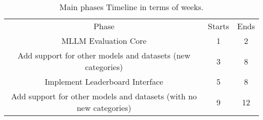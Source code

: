 \begin{table}
 \begin{tabular}{|c|c|c|}
     Phase & Starts & Ends \\
     MLLM Evaluation Core & 1 & 2 \\
     Add support for other models and datasets (new categories) & 3 & 8 \\
     Implement Leaderboard Interface &  5 & 8 \\
     Add support for other models and datasets (with no new categories) & 9 & 12 \\
 \end{tabular}
 \caption{Main phases Timeline in terms of weeks.}\label{tab:timeline}
  \end{table}
